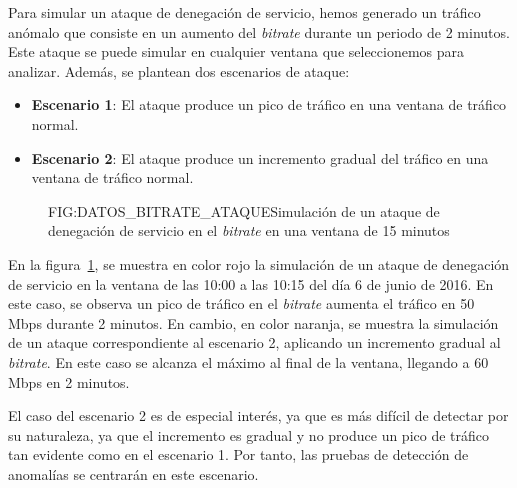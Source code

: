 Para simular un ataque de denegación de servicio, hemos generado un tráfico anómalo que consiste en un aumento del \textit{bitrate} durante un periodo de 2 minutos. Este ataque se puede simular en cualquier ventana que seleccionemos para analizar. Además, se plantean dos escenarios de ataque:
\begin{itemize}
    \item \textbf{Escenario 1}: El ataque produce un pico de tráfico en una ventana de tráfico normal.
    \item \textbf{Escenario 2}: El ataque produce un incremento gradual del tráfico en una ventana de tráfico normal.
\end{itemize}

\begin{figure}[Simulación de un ataque de denegación de servicio en el \textit{bitrate} en una ventana de 15 minutos]{FIG:DATOS_BITRATE_ATAQUE}{Simulación de un ataque de denegación de servicio en el \textit{bitrate} en una ventana de 15 minutos}
    \label{FIG:DATOS_BITRATE_ATAQUE}
\end{figure}

En la figura~\ref{FIG:DATOS_BITRATE_ATAQUE}, se muestra en color rojo la simulación de un ataque de denegación de servicio en la ventana de las 10:00 a las 10:15 del día 6 de junio de 2016. En este caso, se observa un pico de tráfico en el \textit{bitrate} aumenta el tráfico en 50 Mbps durante 2 minutos.
En cambio, en color naranja, se muestra la simulación de un ataque correspondiente al escenario 2, aplicando un incremento gradual al \textit{bitrate}. En este caso se alcanza el máximo al final de la ventana, llegando a 60 Mbps en 2 minutos.

El caso del escenario 2 es de especial interés, ya que es más difícil de detectar por su naturaleza, ya que el incremento es gradual y no produce un pico de tráfico tan evidente como en el escenario 1. Por tanto, las pruebas de detección de anomalías se centrarán en este escenario.
